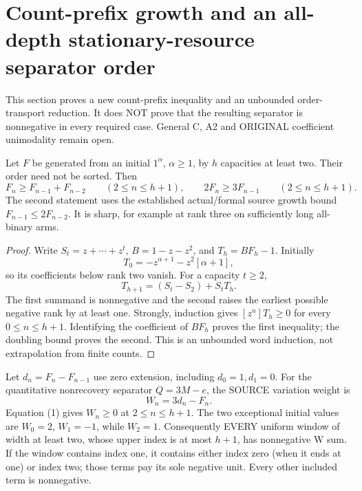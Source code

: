 \section{Count-prefix growth and an all-depth stationary-resource separator order}
This section proves a new count-prefix inequality and an unbounded
order-transport reduction. It does NOT prove that the resulting
separator is nonnegative in every required case. General C, A2 and
ORIGINAL coefficient unimodality remain open.

\begin{theorem}
Let $F$ be generated from an initial $1^\alpha$, $\alpha\ge1$, by
$h$ capacities at least two. Their order need not be sorted. Then
\[
 F_n\ge F_{n-1}+F_{n-2}\qquad(2\le n\le h+1),
 \qquad 2F_n\ge3F_{n-1}\qquad(2\le n\le h+1).       \tag{1}
\]
The second statement uses the established actual/formal source
growth bound $F_{n-1}\le2F_{n-2}$. It is sharp, for example at
rank three on sufficiently long all-binary arms.
\end{theorem}
\begin{proof}
Write $S_t=z+\cdots+z^t$, $B=1-z-z^2$, and
$T_h=BF_h-1$. Initially
\[
 T_0=-z^{\alpha+1}-z^2[\alpha+1],
\]
so its coefficients below rank two vanish. For a capacity $t\ge2$,
\[
 T_{h+1}=(S_t-S_2)+S_tT_h.                         \tag{2}
\]
The first summand is nonnegative and the second raises the earliest
possible negative rank by at least one. Strongly, induction gives
$[z^n]T_h\ge0$ for every $0\le n\le h+1$.
Identifying the coefficient of $BF_h$ proves the first inequality;
the doubling bound proves the second. This is an unbounded word
induction, not extrapolation from finite counts.
\end{proof}

Let $d_n=F_n-F_{n-1}$ use zero extension, including $d_0=1,d_1=0$.
For the quantitative nonrecovery separator $Q=3M-e$, the SOURCE
variation weight is
\[
 W_n=3d_n-F_n.
\]
Equation (1) gives $W_n\ge0$ at $2\le n\le h+1$.
The two exceptional initial values are $W_0=2$, $W_1=-1$, while
$W_2=1$. Consequently EVERY uniform window of width at least two,
whose upper index is at most $h+1$, has nonnegative W sum.
If the window contains index one, it contains either index zero
(when it ends at one) or index two; those terms pay its sole negative
unit. Every other included term is nonnegative.

